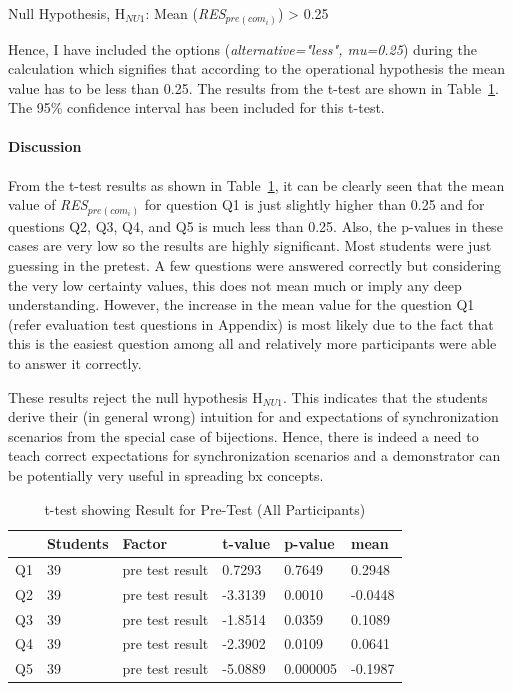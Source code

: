 Null Hypothesis, {H$_{NU1}$}: Mean (\textit{RES$_{pre(com_i)}$}) > 0.25 

Hence, I have included the options (\textit{alternative="less", mu=0.25}) during the calculation which signifies that according to the operational hypothesis the mean value has to be less than 0.25. The results from the t-test are shown in Table~\ref{tab:t-test_PreTest}. The 95\% confidence interval has been included for this t-test.

\paragraph{Discussion}
From the t-test results as shown in Table~\ref{tab:t-test_PreTest}, it can be clearly seen that the mean value of \textit{RES$_{pre(com_i)}$} for question Q1 is just slightly higher than 0.25 and for questions Q2, Q3, Q4, and Q5 is much less than 0.25. Also, the p-values in these cases are very low so the results are highly significant. Most students were just guessing in the pretest.  A few questions were answered correctly but considering the very low certainty values, this does not mean much or imply any deep understanding. However, the increase in the mean value for the question Q1 (refer evaluation test questions in Appendix) is most likely due to the fact that this is the easiest question among all and relatively more participants were able to answer it correctly.

These results reject the null hypothesis {H$_{NU1}$}. This indicates that the students derive their (in general wrong) intuition for and expectations of synchronization scenarios from the special case of bijections. Hence, there is indeed a need to teach correct expectations for synchronization scenarios and a demonstrator can be potentially very useful in spreading bx concepts.

\begin{table}[ht]
	\centering	
	\begin{tabular}{|p{1cm}|p{1.5cm}|p{4cm}|p{1.5cm}|p{1.5cm}|p{1.5cm}|}
		\hline
		\rowcolor[gray]{.8}	
		\textbf{} & \textbf{Students} & \textbf{Factor} & \textbf{t-value} & \textbf{p-value} & \textbf{mean}\\
		\hline
		Q1 & 39 & pre test result & 0.7293 & 0.7649 & 0.2948\\
		\hline
		Q2 & 39 & pre test result & -3.3139 & 0.0010 & -0.0448\\
		\hline
		Q3 & 39 & pre test result & -1.8514 & 0.0359 & 0.1089\\
		\hline	
		Q4 & 39 & pre test result & -2.3902 & 0.0109 & 0.0641\\
		\hline
		Q5 & 39 & pre test result & -5.0889 & 0.000005 & -0.1987\\
		\hline			
	\end{tabular}
	\caption{t-test showing Result for Pre-Test (All Participants)}
	\label{tab:t-test_PreTest}
\end{table}

